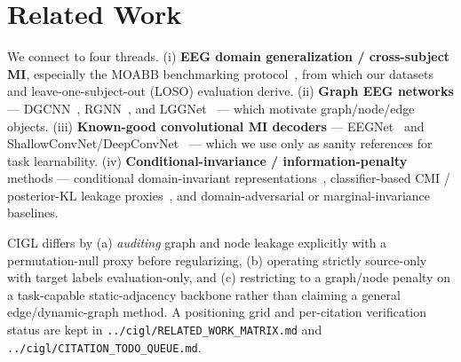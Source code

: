 \section{Related Work}

We connect to four threads. (i) \textbf{EEG domain generalization / cross-subject MI}, especially the MOABB
benchmarking protocol~\citep{jayaram2018moabb}, from which our datasets and leave-one-subject-out (LOSO)
evaluation derive. (ii) \textbf{Graph EEG networks} --- DGCNN~\citep{song2018dgcnn},
RGNN~\citep{zhong2019rgnn}, and LGGNet~\citep{ding2021lggnet} --- which motivate graph/node/edge objects.
(iii) \textbf{Known-good convolutional MI decoders} --- EEGNet~\citep{lawhern2018eegnet} and
ShallowConvNet/DeepConvNet~\citep{schirrmeister2017deep} --- which we use only as sanity references for task
learnability. (iv) \textbf{Conditional-invariance / information-penalty} methods --- conditional
domain-invariant representations~\citep{li2018conditional}, classifier-based CMI / posterior-KL leakage
proxies~\citep{mukherjee2020ccmi}, and domain-adversarial or marginal-invariance baselines.

CIGL differs by (a) \emph{auditing} graph and node leakage explicitly with a permutation-null proxy before
regularizing, (b) operating strictly source-only with target labels evaluation-only, and (c) restricting to
a graph/node penalty on a task-capable static-adjacency backbone rather than claiming a general
edge/dynamic-graph method. A positioning grid and per-citation verification status are kept in
\texttt{../cigl/RELATED\_WORK\_MATRIX.md} and \texttt{../cigl/CITATION\_TODO\_QUEUE.md}.

